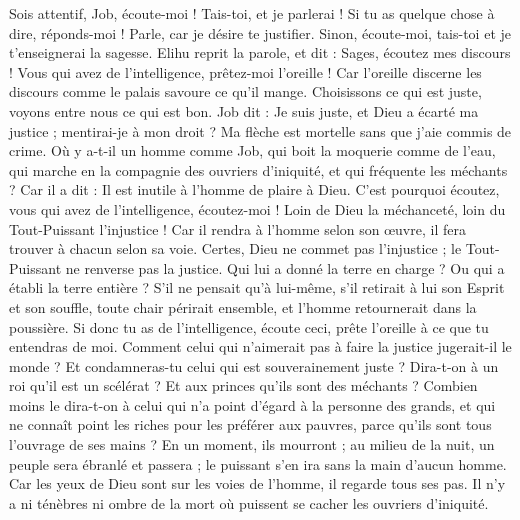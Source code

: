 \begin{multicols}{2}
Sois attentif, Job, écoute-moi ! Tais-toi, et je parlerai !
Si tu as quelque chose à dire, réponds-moi ! Parle, car je désire te justifier.
Sinon, écoute-moi, tais-toi et je t'enseignerai la sagesse.
\VerseOne{}Elihu reprit la parole, et dit :
Sages, écoutez mes discours ! Vous qui avez de l'intelligence, prêtez-moi l'oreille !
Car l'oreille discerne les discours comme le palais savoure ce qu'il mange.
Choisissons ce qui est juste, voyons entre nous ce qui est bon.
Job dit : Je suis juste, et Dieu a écarté ma justice ;
mentirai-je à mon droit ? Ma flèche est mortelle sans que j'aie commis de crime.
Où y a-t-il un homme comme Job, qui boit la moquerie comme de l'eau,
qui marche en la compagnie des ouvriers d'iniquité, et qui fréquente les méchants ? 
Car il a dit : Il est inutile à l'homme de plaire à Dieu.
 C'est pourquoi écoutez, vous qui avez de l'intelligence, écoutez-moi ! Loin de Dieu la méchanceté, loin du Tout-Puissant l'injustice !
Car il rendra à l'homme selon son œuvre, il fera trouver à chacun selon sa voie.
Certes, Dieu ne commet pas l'injustice ; le Tout-Puissant ne renverse pas la justice.
Qui lui a donné la terre en charge ? Ou qui a établi la terre entière ?
S'il ne pensait qu'à lui-même, s'il retirait à lui son Esprit et son souffle,
toute chair périrait ensemble, et l'homme retournerait dans la poussière.
Si donc tu as de l'intelligence, écoute ceci, prête l'oreille à ce que tu entendras de moi.
Comment celui qui n'aimerait pas à faire la justice jugerait-il le monde ? Et condamneras-tu celui qui est souverainement juste ?
Dira-t-on à un roi qu'il est un scélérat ? Et aux princes qu'ils sont des méchants ?
Combien moins le dira-t-on à celui qui n'a point d'égard à la personne des grands, et qui ne connaît point les riches pour les préférer aux pauvres, parce qu'ils sont tous l'ouvrage de ses mains ?
En un moment, ils mourront ; au milieu de la nuit, un peuple sera ébranlé et passera ; le puissant s'en ira sans la main d'aucun homme.
Car les yeux de Dieu sont sur les voies de l'homme, il regarde tous ses pas.
Il n'y a ni ténèbres ni ombre de la mort où puissent se cacher les ouvriers d'iniquité.

\end{multicols}
